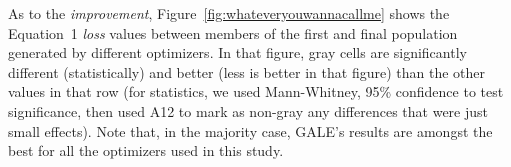 \documentclass[10pt,journal,compsoc]{IEEEtran}
\newcommand{\fig}[1]{Figure~\ref{fig:#1}}
\newenvironment{changed}{\par}{\par}
\begin{document}
\begin{changed}
As to the {\em improvement}, 
 \fig{whateveryouwannacallme} shows the
Equation~1 {\em loss} values between members of the
first and final population generated by different
optimizers. In that figure,
 gray cells are significantly different
(statistically) and better (less is better in that figure)
than the other values in that row
(for statistics, we used Mann-Whitney, 95\%
confidence to test significance, then used A12 to
mark as non-gray any differences that were just
small effects). Note that, in the majority case, GALE's results
are amongst the best for all the optimizers used in this study.


\end{changed}



\begin{changed}


\end{changed}
\end{document}
